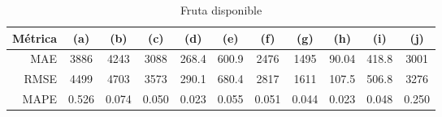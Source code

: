 \documentclass[a4paper,10pt]{article}
\begin{document}
\begin{table}[h!]
 \begin{center}
  \begin{tabular}{|r|c|c|c|c|c|c|c|c|c|c|}
    Métrica & (a) & (b) & (c) & (d) & (e) & (f) & (g) & (h) & (i) & (j) \\ \hline
    MAE & 3886 & 4243 & 3088 & 268.4 & 600.9 & 2476 & 1495 & 90.04 & 418.8 & 3001 \\
    RMSE & 4499 & 4703 & 3573 & 290.1 & 680.4 & 2817 & 1611 & 107.5 & 506.8 & 3276 \\
    MAPE & 0.526 & 0.074 & 0.050 & 0.023 & 0.055 & 0.051 & 0.044 & 0.023 & 0.048 & 0.250 \\ \hline
  \end{tabular}
  \caption{Fruta disponible}
  \label{tab:eth_prophet_wk}
 \end{center}
\end{table}
\end{document}
